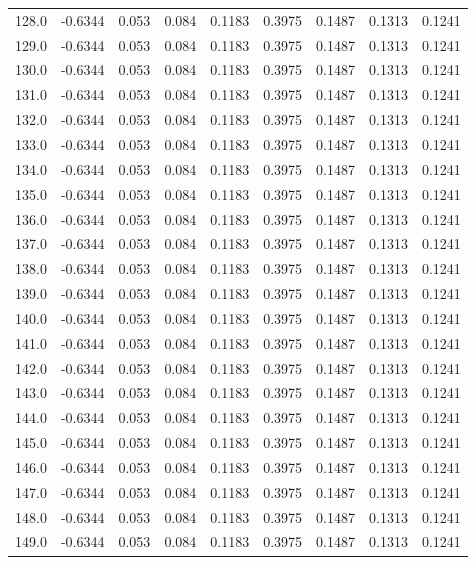 \begin{longtable}{lrrrrrrrr}
128.0 & -0.6344 & 0.053 & 0.084 & 0.1183 & 0.3975 & 0.1487 & 0.1313 & 0.1241 \\
129.0 & -0.6344 & 0.053 & 0.084 & 0.1183 & 0.3975 & 0.1487 & 0.1313 & 0.1241 \\
130.0 & -0.6344 & 0.053 & 0.084 & 0.1183 & 0.3975 & 0.1487 & 0.1313 & 0.1241 \\
131.0 & -0.6344 & 0.053 & 0.084 & 0.1183 & 0.3975 & 0.1487 & 0.1313 & 0.1241 \\
132.0 & -0.6344 & 0.053 & 0.084 & 0.1183 & 0.3975 & 0.1487 & 0.1313 & 0.1241 \\
133.0 & -0.6344 & 0.053 & 0.084 & 0.1183 & 0.3975 & 0.1487 & 0.1313 & 0.1241 \\
134.0 & -0.6344 & 0.053 & 0.084 & 0.1183 & 0.3975 & 0.1487 & 0.1313 & 0.1241 \\
135.0 & -0.6344 & 0.053 & 0.084 & 0.1183 & 0.3975 & 0.1487 & 0.1313 & 0.1241 \\
136.0 & -0.6344 & 0.053 & 0.084 & 0.1183 & 0.3975 & 0.1487 & 0.1313 & 0.1241 \\
137.0 & -0.6344 & 0.053 & 0.084 & 0.1183 & 0.3975 & 0.1487 & 0.1313 & 0.1241 \\
138.0 & -0.6344 & 0.053 & 0.084 & 0.1183 & 0.3975 & 0.1487 & 0.1313 & 0.1241 \\
139.0 & -0.6344 & 0.053 & 0.084 & 0.1183 & 0.3975 & 0.1487 & 0.1313 & 0.1241 \\
140.0 & -0.6344 & 0.053 & 0.084 & 0.1183 & 0.3975 & 0.1487 & 0.1313 & 0.1241 \\
141.0 & -0.6344 & 0.053 & 0.084 & 0.1183 & 0.3975 & 0.1487 & 0.1313 & 0.1241 \\
142.0 & -0.6344 & 0.053 & 0.084 & 0.1183 & 0.3975 & 0.1487 & 0.1313 & 0.1241 \\
143.0 & -0.6344 & 0.053 & 0.084 & 0.1183 & 0.3975 & 0.1487 & 0.1313 & 0.1241 \\
144.0 & -0.6344 & 0.053 & 0.084 & 0.1183 & 0.3975 & 0.1487 & 0.1313 & 0.1241 \\
145.0 & -0.6344 & 0.053 & 0.084 & 0.1183 & 0.3975 & 0.1487 & 0.1313 & 0.1241 \\
146.0 & -0.6344 & 0.053 & 0.084 & 0.1183 & 0.3975 & 0.1487 & 0.1313 & 0.1241 \\
147.0 & -0.6344 & 0.053 & 0.084 & 0.1183 & 0.3975 & 0.1487 & 0.1313 & 0.1241 \\
148.0 & -0.6344 & 0.053 & 0.084 & 0.1183 & 0.3975 & 0.1487 & 0.1313 & 0.1241 \\
149.0 & -0.6344 & 0.053 & 0.084 & 0.1183 & 0.3975 & 0.1487 & 0.1313 & 0.1241 \\

\end{longtable}
